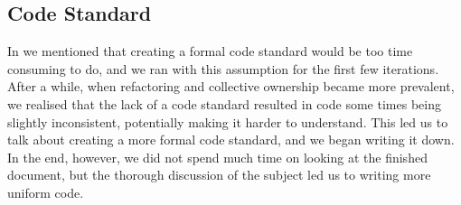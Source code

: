 \subsection{Code Standard}
In  we mentioned that creating a formal code standard would be too time consuming to do, and we ran with this assumption for the first few iterations.
After a while, when refactoring and collective ownership became more prevalent, we realised that the lack of a code standard resulted in code some times being slightly inconsistent, potentially making it harder to understand.
This led us to talk about creating a more formal code standard, and we began writing it down.
In the end, however, we did not spend much time on looking at the finished document, but the thorough discussion of the subject led us to writing more uniform code.